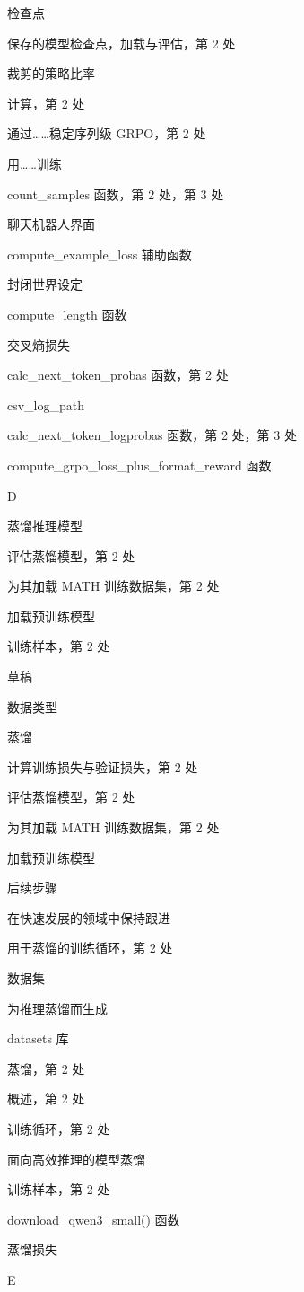 检查点

保存的模型检查点，加载与评估，第 2 处

裁剪的策略比率

计算，第 2 处

通过……稳定序列级 GRPO，第 2 处

用……训练

count\_samples 函数，第 2 处，第 3 处

聊天机器人界面

compute\_example\_loss 辅助函数

封闭世界设定

compute\_length 函数

交叉熵损失

calc\_next\_token\_probas 函数，第 2 处

csv\_log\_path

calc\_next\_token\_logprobas 函数，第 2 处，第 3 处

compute\_grpo\_loss\_plus\_format\_reward 函数

D

蒸馏推理模型

评估蒸馏模型，第 2 处

为其加载 MATH 训练数据集，第 2 处

加载预训练模型

训练样本，第 2 处

草稿

数据类型

蒸馏

计算训练损失与验证损失，第 2 处

评估蒸馏模型，第 2 处

为其加载 MATH 训练数据集，第 2 处

加载预训练模型

后续步骤

在快速发展的领域中保持跟进

用于蒸馏的训练循环，第 2 处

数据集

为推理蒸馏而生成

datasets 库

蒸馏，第 2 处

概述，第 2 处

训练循环，第 2 处

面向高效推理的模型蒸馏

训练样本，第 2 处

download\_qwen3\_small() 函数

蒸馏损失

E


